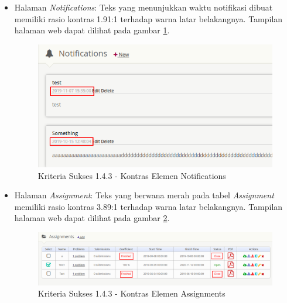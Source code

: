 \documentclass[a4paper,twoside]{article}
\begin{document}
\begin{enumerate}
\begin{itemize}
			\item Halaman \textit{Notifications}: Teks yang menunjukkan waktu notifikasi dibuat memiliki rasio kontras 1.91:1 terhadap warna latar belakangnya. Tampilan halaman web dapat dilihat pada gambar \ref{fig:kepatuhan_1_4_3_notifications}.
			\begin{figure}[H]
				\centering  
				\includegraphics[scale=0.5]{kepatuhan_1_4_3_notifications}  
				\caption[Kriteria Sukses 1.4.3 - Kontras Elemen Notifications]{Kriteria Sukses 1.4.3 - Kontras Elemen Notifications} 
				\label{fig:kepatuhan_1_4_3_notifications} 
			\end{figure}
			
			\item Halaman \textit{Assignment}: Teks yang berwana merah pada tabel \textit{Assignment} memiliki rasio kontras 3.89:1 terhadap warna latar belakangnya. Tampilan halaman web dapat dilihat pada gambar \ref{fig:kepatuhan_1_4_3_assignments}.
			\begin{figure}[H]
				\centering  
				\includegraphics[scale=0.3]{kepatuhan_1_4_3_assignments}  
				\caption[Kriteria Sukses 1.4.3 - Kontras Elemen Assignments]{Kriteria Sukses 1.4.3 - Kontras Elemen Assignments} 
				\label{fig:kepatuhan_1_4_3_assignments} 
			\end{figure}
			

\end{itemize}
\end{enumerate}
\end{document}
